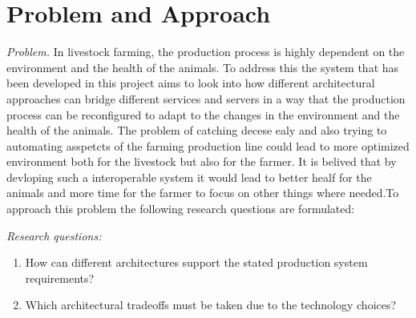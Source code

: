 \section{Problem and Approach}

\label{sec:problem}
\emph{Problem.}
In livestock farming, the production process is highly dependent on the environment and the health of the animals. To address this the system that has been developed in this project aims to look into how different architectural approaches can bridge different services and servers in a way that the production process can be reconfigured to adapt to the changes in the environment and the health of the animals. The problem of catching decese ealy and also trying to automating asspetcts of the farming production line could lead to more optimized environment both for the livestock but also for the farmer. It is belived that by devloping such a interoperable system it would lead to better healf for the animals and more time for the farmer to focus on other things where needed.To approach this problem the following research questions are formulated: \vspace{1mm}


\emph{Research questions:}
\begin{enumerate}
    \item How can different architectures support the stated production system requirements?
    \item Which architectural tradeoffs must be taken due to the technology choices?
\end{enumerate}


